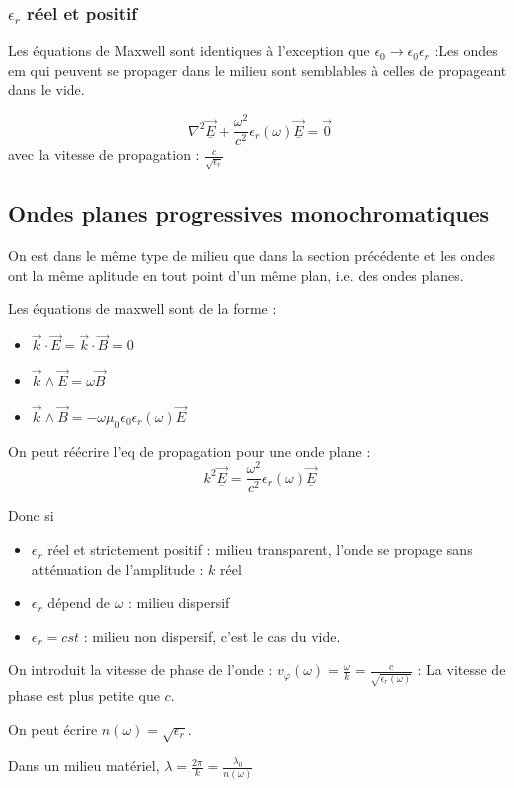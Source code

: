 \documentclass[french]{yLectureNote}
\renewcommand{\vec}{\overrightarrow}
\newcommand{\lap}{\nabla^2}
\begin{document}
\subsubsection{$\epsilon_r$ réel et positif}
Les équations de Maxwell sont identiques à l'exception que $\epsilon_0\to \epsilon_0\epsilon_r$ :Les ondes em qui peuvent se propager dans le milieu sont semblables à celles de propageant dans le vide.

$$\lap \vec{\underline{E}}+\frac{\omega^2}{c^2}\epsilon_r(\omega)\vec{\underline{E}}=\vec{0}$$
avec la vitesse de propagation : $\frac{c}{\sqrt{\epsilon_r}}$
\subsection{Ondes planes progressives monochromatiques}
On est dans le même type de milieu que dans la section précédente et les ondes ont la même aplitude en tout point d'un même plan, i.e. des ondes planes.

Les équations de maxwell sont de la forme :
\begin{itemize}
    \item $\vec{k}\cdot \vec{E} = \vec{k}\cdot \vec{B} = 0$
    \item $\vec{k}\wedge \vec{E} = \omega \vec{B}$
    \item $\vec{k}\wedge \vec{B} = -\omega \mu_0\epsilon_0\epsilon_r(\omega)\vec{E}$
\end{itemize}
 On peut réécrire l'eq de propagation pour une onde plane :
 $$k^2 \vec{\underline{E}} = \frac{\omega^2}{c^2}\epsilon_r(\omega)\vec{\underline{E}}$$
 
 Donc si 
 \begin{itemize}
    \item $\epsilon_r$ réel et strictement positif : milieu transparent, l'onde se propage sans atténuation de l'amplitude : $k$ réel
    \item $\epsilon_r$ dépend de $\omega$ : milieu dispersif
    \item $\epsilon_r =cst$ : milieu non dispersif, c'est le cas du vide.
 \end{itemize}
On introduit la vitesse de phase de l'onde :
$v_{\varphi}(\omega) = \frac{\omega}{k} = \frac{c}{\sqrt{\epsilon_r(\omega)}}$ : La vitesse de phase est plus petite que $c$.

On peut écrire $n(\omega) = \sqrt{\epsilon_r}$.

Dans un milieu matériel, $\lambda = \frac{2\pi}{k} = \frac{\lambda_0}{n(\omega)}$
\end{document}
